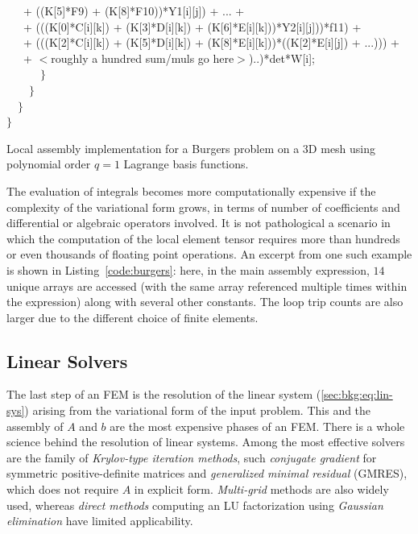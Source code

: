 \begin{algorithm}
~~~+ ((K[5]*F9) + (K[8]*F10))*Y1[i][j]) + ... + \\
~~~+ (((K[0]*C[i][k]) + (K[3]*D[i][k]) + (K[6]*E[i][k]))*Y2[i][j]))*f11) + \\
~~~+ (((K[2]*C[i][k]) + (K[5]*D[i][k]) + (K[8]*E[i][k]))*((K[2]*E[i][j]) + ...))) + \\
~~~+ $<$roughly a hundred sum/muls go here$>$)..)*det*W[i];\\
~~~~~~$\rbrace$\\
~~~~$\rbrace$\\
~~$\rbrace$ \\
$\rbrace$
\caption{Local assembly implementation for a Burgers problem on a 3D mesh using polynomial order $q=1$ Lagrange basis functions.}
\label{code:burgers}
\end{algorithm}

The evaluation of integrals becomes more computationally expensive if the complexity of the variational form grows, in terms of number of coefficients and differential or algebraic operators involved. It is not pathological a scenario in which the computation of the local element tensor requires more than hundreds or even thousands of floating point operations. An excerpt from one such example is shown in Listing~\ref{code:burgers}: here, in the main assembly expression, $14$ unique arrays are accessed (with the same array referenced multiple times within the expression) along with several other constants. The loop trip counts are also larger due to the different choice of finite elements. 

%
%


\subsection{Linear Solvers}
\label{sec:bkg:linearsolvers}
The last step of an FEM is the resolution of the linear system (\ref{sec:bkg:eq:lin-sys}) arising from the variational form of the input problem. This and the assembly of $A$ and $b$ are the most expensive phases of an FEM. There is a whole science behind the resolution of linear systems. Among the most effective solvers are the family of {\em Krylov-type iteration methods}, such {\em conjugate gradient} for symmetric positive-definite matrices and {\em generalized minimal residual} (GMRES), which does not require $A$ in explicit form. {\em Multi-grid} methods are also widely used, whereas {\em direct methods} computing an LU factorization using {\em Gaussian elimination} have limited applicability. 

